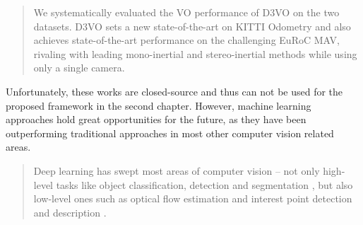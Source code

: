 \begin{quote}
We systematically evaluated the VO performance of D3VO on the two datasets.
D3VO sets a new state-of-the-art on KITTI Odometry and
also achieves state-of-the-art performance on the challenging EuRoC MAV, rivaling with leading mono-inertial and
stereo-inertial methods while using only a single camera.
\end{quote}

Unfortunately, these works are closed-source and thus can not be used for the proposed framework in the second chapter. However, machine learning approaches 
hold great opportunities for the future, as they have been outperforming traditional approaches in most other computer vision related areas.  

\begin{quote}
Deep learning has swept most areas of computer vision
– not only high-level tasks like object classification, detection and segmentation \cite{p1} \cite{p2} \cite{p3}, but also low-level ones
such as optical flow estimation \cite{p4} \cite{p5} and interest point
detection and description \cite{p6} \cite{p7}. \cite{deepslam}
\end{quote}


